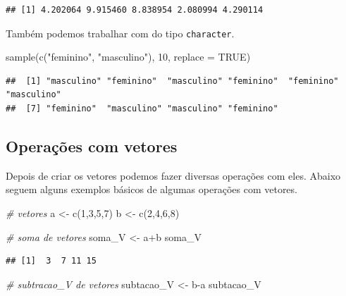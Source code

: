 \documentclass[
]{book}
\newenvironment{Shaded}{\begin{snugshade}}{\end{snugshade}}
\newcommand{\AttributeTok}[1]{\textcolor[rgb]{0.77,0.63,0.00}{#1}}
\newcommand{\CommentTok}[1]{\textcolor[rgb]{0.56,0.35,0.01}{\textit{#1}}}
\newcommand{\ConstantTok}[1]{\textcolor[rgb]{0.00,0.00,0.00}{#1}}
\newcommand{\DecValTok}[1]{\textcolor[rgb]{0.00,0.00,0.81}{#1}}
\newcommand{\FunctionTok}[1]{\textcolor[rgb]{0.00,0.00,0.00}{#1}}
\newcommand{\NormalTok}[1]{#1}
\newcommand{\OtherTok}[1]{\textcolor[rgb]{0.56,0.35,0.01}{#1}}
\newcommand{\SpecialCharTok}[1]{\textcolor[rgb]{0.00,0.00,0.00}{#1}}
\newcommand{\StringTok}[1]{\textcolor[rgb]{0.31,0.60,0.02}{#1}}
\begin{document}
\begin{verbatim}
## [1] 4.202064 9.915460 8.838954 2.080994 4.290114
\end{verbatim}

Também podemos trabalhar com do tipo \texttt{character}.

\begin{Shaded}
\begin{Highlighting}[]
\FunctionTok{sample}\NormalTok{(}\FunctionTok{c}\NormalTok{(}\StringTok{"feminino"}\NormalTok{, }\StringTok{"masculino"}\NormalTok{), }\DecValTok{10}\NormalTok{, }\AttributeTok{replace =} \ConstantTok{TRUE}\NormalTok{)}
\end{Highlighting}
\end{Shaded}

\begin{verbatim}
##  [1] "masculino" "feminino"  "masculino" "feminino"  "feminino"  "masculino"
##  [7] "feminino"  "masculino" "masculino" "feminino"
\end{verbatim}

\hypertarget{operauxe7uxf5es-com-vetores}{%
\subsection{Operações com vetores}\label{operauxe7uxf5es-com-vetores}}

Depois de criar os vetores podemos fazer diversas operações com eles. Abaixo seguem alguns exemplos básicos de algumas operações com vetores.

\begin{Shaded}
\begin{Highlighting}[]
\CommentTok{\# vetores}
\NormalTok{a }\OtherTok{\textless{}{-}} \FunctionTok{c}\NormalTok{(}\DecValTok{1}\NormalTok{,}\DecValTok{3}\NormalTok{,}\DecValTok{5}\NormalTok{,}\DecValTok{7}\NormalTok{)}
\NormalTok{b }\OtherTok{\textless{}{-}} \FunctionTok{c}\NormalTok{(}\DecValTok{2}\NormalTok{,}\DecValTok{4}\NormalTok{,}\DecValTok{6}\NormalTok{,}\DecValTok{8}\NormalTok{)}

\CommentTok{\# soma de vetores}
\NormalTok{soma\_V }\OtherTok{\textless{}{-}}\NormalTok{ a}\SpecialCharTok{+}\NormalTok{b}
\NormalTok{soma\_V}
\end{Highlighting}
\end{Shaded}

\begin{verbatim}
## [1]  3  7 11 15
\end{verbatim}

\begin{Shaded}
\begin{Highlighting}[]
\CommentTok{\# subtracao\_V de vetores}
\NormalTok{subtacao\_V }\OtherTok{\textless{}{-}}\NormalTok{ b}\SpecialCharTok{{-}}\NormalTok{a}
\NormalTok{subtacao\_V}
\end{Highlighting}
\end{Shaded}
\end{document}
